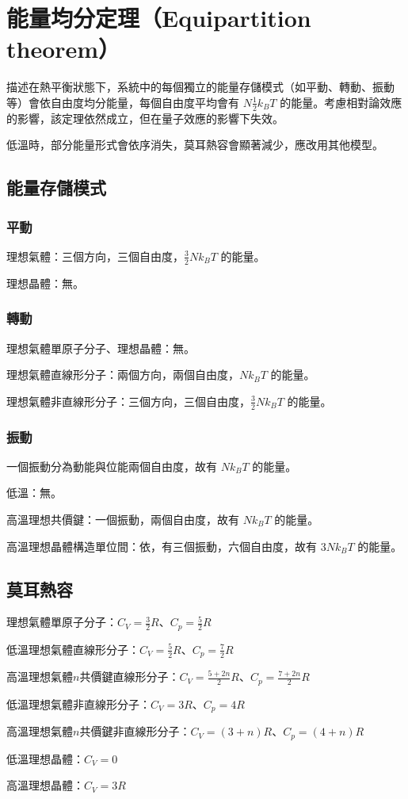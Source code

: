 \documentclass[a4paper,12pt]{report}
\begin{document}
\section{能量均分定理（Equipartition theorem）}
描述在熱平衡狀態下，系統中的每個獨立的能量存儲模式（如平動、轉動、振動等）會依自由度均分能量，每個自由度平均會有 \( N \frac{1}{2} k_B T \) 的能量。考慮相對論效應的影響，該定理依然成立，但在量子效應的影響下失效。

低溫時，部分能量形式會依序消失，莫耳熱容會顯著減少，應改用其他模型。
\subsection{能量存儲模式}
\subsubsection{平動}
\bit
\item 理想氣體：三個方向，三個自由度，\( \frac{3}{2}Nk_BT \) 的能量。
\item 理想晶體：無。
\eit
\subsubsection{轉動}
\bit
\item 理想氣體單原子分子、理想晶體：無。
\item 理想氣體直線形分子：兩個方向，兩個自由度，\( Nk_BT \) 的能量。
\item 理想氣體非直線形分子：三個方向，三個自由度，\( \frac{3}{2} Nk_BT \) 的能量。
\eit
\subsubsection{振動}
一個振動分為動能與位能兩個自由度，故有 \( Nk_B T \) 的能量。
\bit
\item 低溫：無。
\item 高溫理想共價鍵：一個振動，兩個自由度，故有 \( Nk_B T \) 的能量。
\item 高溫理想晶體構造單位間：依，有三個振動，六個自由度，故有 \( 3 Nk_B T \) 的能量。
\eit
\subsection{莫耳熱容}
\bit
\item 理想氣體單原子分子：$C_V=\frac{3}{2} R$、$C_p=\frac{5}{2}R$
\item 低溫理想氣體直線形分子：$C_V=\frac{5}{2}R$、$C_p=\frac{7}{2}R$
\item 高溫理想氣體$n$共價鍵直線形分子：$C_V=\frac{5+2n}{2}R$、$C_p=\frac{7+2n}{2}R$
\item 低溫理想氣體非直線形分子：$C_V=3R$、$C_p=4R$
\item 高溫理想氣體$n$共價鍵非直線形分子：$C_V=(3+n)R$、$C_p=(4+n)R$
\item 低溫理想晶體：$C_V=0$
\item 高溫理想晶體：$C_V=3R$
\eit
\end{document}

